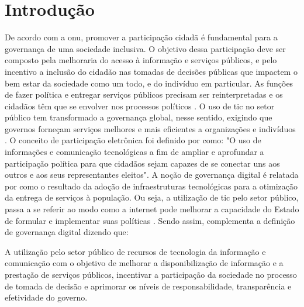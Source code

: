 \chapter[Introdução]{Introdução}
\label{cap:cap1}
\par
De acordo com a \acrfull{onu}, promover a participação cidadã é fundamental para a governança de uma sociedade inclusiva.
O objetivo dessa participação deve ser composto pela melhoraria do acesso à informação e serviços públicos,
e pelo incentivo a inclusão do cidadão nas tomadas de decisões públicas que impactem o bem estar da sociedade como um todo, e do indivíduo em particular. 
As funções de fazer política e entregar serviços públicos precisam ser reinterpretadas e os cidadãos têm que se envolver nos processos políticos \cite{bovaird2007beyond}. 
O uso de \acrfull{tic} no setor público tem transformado a governança global, nesse sentido, exigindo que governos forneçam
serviços melhores e mais eficientes a organizações e indivíduos \cite{afdb2014uneca}. O conceito de participação eletrônica foi definido por  como:
"O uso de informações e comunicação tecnológicas a fim de ampliar e aprofundar a participação política para que cidadãos sejam capazes de se conectar 
uns aos outros e aos seus representantes eleitos".
A noção de governança digital é relatada por  como o resultado da adoção de infraestruturas tecnológicas para a otimização da entrega de serviços à população.
Ou seja, a utilização de \acrshort{tic} pelo setor público, passa a se referir ao modo como a internet pode melhorar a capacidade do Estado de formular
e implementar suas políticas \cite{parra2017governancca}. Sendo assim,  complementa a definição de governança digital dizendo que:

\hspace{4cm}
\begin{minipage}{.66\textwidth}		
    \begin{singlespace}
        \fontsize{10}{12}\selectfont A utilização pelo setor público de recursos de tecnologia da informação e comunicação com o objetivo de melhorar a disponibilização
        de informação e a prestação de serviços públicos,
        incentivar a participação da sociedade no processo de tomada de decisão e aprimorar os níveis de responsabilidade, transparência e efetividade do governo.    
        \end{singlespace}
\end{minipage}

